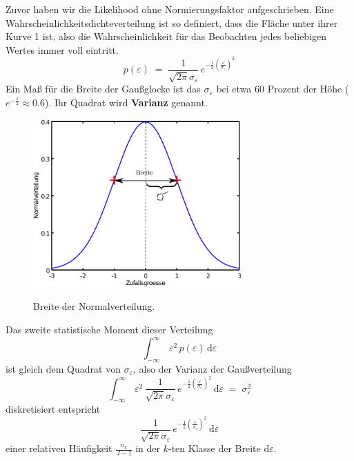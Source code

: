 \documentclass[a4paper,12pt,DIV=15]{scrartcl}
\begin{document}
Zuvor haben wir die Likelihood ohne Normierungsfaktor aufgeschrieben.
Eine Wahrscheinlichkeitsdichteverteilung ist so definiert, dass die Fläche unter ihrer Kurve 1 ist, also die Wahrscheinlichkeit
für das Beobachten jedes beliebigen Wertes immer voll eintritt.
\begin{equation}
p(\varepsilon) \; = \; \frac{1}{\sqrt{2 \pi} \sigma_{\varepsilon}} \, e^{-\frac{1}{2} \left(\frac{\varepsilon}{\sigma_{\varepsilon}}\right)^2}
\end{equation}
Ein Maß für die Breite der Gaußglocke ist das $\sigma_{\varepsilon}$ bei etwa 60 Prozent der Höhe ($e^{-\frac{1}{2}} \approx 0.6$).
Ihr Quadrat wird \textbf{Varianz} genannt.
\begin{figure}
\begin{center}
\includegraphics[width=80mm]{media/breite_norm_pdf.pdf}
\label{normpdf}
\caption{Breite der Normalverteilung.}
\end{center}
\end{figure}
Das zweite statistische Moment dieser Verteilung 
\begin{equation}
\int_{-\infty}^\infty \, \varepsilon^2 \, p(\varepsilon) \, \mathrm{d} \varepsilon 
\end{equation}
ist gleich dem Quadrat von $\sigma_\varepsilon$, also der Varianz der Gaußverteilung
\begin{equation}
\int_{-\infty}^\infty \, \varepsilon^2 \,  \frac{1}{\sqrt{2 \pi} \sigma_{\varepsilon}} \, e^{-\frac{1}{2} \left(\frac{\varepsilon}{\sigma_\varepsilon}\right)^2} \, \mathrm{d} \varepsilon  \; = \; \sigma_{\varepsilon}^2
\end{equation}
diskretisiert entspricht
\begin{equation}
\frac{1}{\sqrt{2 \pi} \sigma_\varepsilon} \, e^{-\frac{1}{2} \left(\frac{\varepsilon}{\sigma_{\varepsilon}}\right)^2} \, \mathrm{d} \varepsilon
\end{equation}
einer relativen Häufigkeit $\frac{n_k}{J-1}$ in der $k$-ten Klasse der Breite $\mathrm{d} \varepsilon$.
\end{document}
